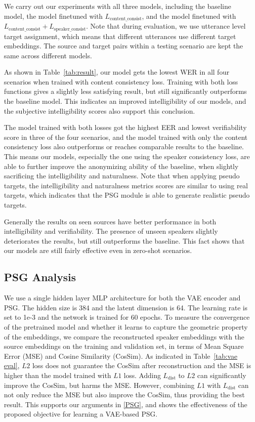 \documentclass[a4paper]{article}
\begin{document}
We carry out our experiments with all three models, including the baseline model, the model finetuned with $L_{\text{content\_consist}}$, and the model finetuned with $L_{\text{content\_consist}}+L_{\text{speaker\_consist}}$. Note that during evaluation, we use utterance level target assignment, which means that different utterances use different target embeddings. The source and target pairs within a testing scenario are kept the same across different models.

As shown in Table~\ref{tab:result}, our model gets the lowest WER in all four scenarios when trained with content consistency loss. Training with both loss functions gives a slightly less satisfying result, but still significantly outperforms the baseline model. This indicates an improved intelligibility of our models, and the subjective intelligibility scores also support this conclusion.

The model trained with both losses got the highest EER and lowest verifiability score in three of the four scenarios, and the model trained with only the content consistency loss also outperforms or reaches comparable results to the baseline. This means our models, especially the one using the speaker consistency loss, are able to further improve the anonymizing ability of the baseline, when slightly sacrificing the intelligibility and naturalness. Note that when applying pseudo targets, the intelligibility and naturalness metrics scores are similar to using real targets, which indicates that the PSG module is able to generate realistic pseudo targets. 

Generally the results on seen sources have better performance in both intelligibility and verifiability. The presence of unseen speakers slightly deteriorates the results, but still outperforms the baseline. This fact shows that our models are still fairly effective even in zero-shot scenarios.

\subsection{PSG Analysis}
\label{PSG Analysis}
We use a single hidden layer MLP architecture for both the VAE encoder and PSG. The hidden size is 384 and the latent dimension is 64. The learning rate is set to 1e-3 and the network is trained for 60 epochs. To measure the convergence of the pretrained model and whether it learns to capture the geometric property of the embeddings, we compare the reconstructed speaker embeddings with the source embeddings on the training and validation set, in terms of Mean Square Error (MSE) and Cosine Similarity (CosSim). As indicated in Table~\ref{tab:vae eval}, $L2$ loss does not guarantee the CosSim after reconstruction and the MSE is higher than the model trained with $L1$ loss. Adding $L_{\text{dist}}$ to $L2$ can significantly improve the CosSim, but harms the MSE. However, combining $L1$ with $L_{\text{dist}}$ can not only reduce the MSE but also improve the CosSim, thus providing the best result. This supports our arguments in \ref{PSG}, and shows the effectiveness of the proposed objective for learning a VAE-based PSG.
\end{document}
